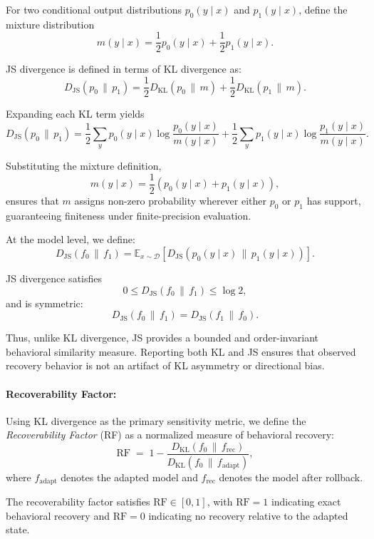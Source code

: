 \documentclass{article}
\begin{document}
	For two conditional output distributions $p_0(y \mid x)$ and $p_1(y \mid x)$, define the mixture distribution
	\[
	m(y \mid x)
	=
	\frac{1}{2} p_0(y \mid x)
	+
	\frac{1}{2} p_1(y \mid x).
	\]
	
	JS divergence is defined in terms of KL divergence as:
	\[
	D_{\mathrm{JS}}(p_0 \,\|\, p_1)
	=
	\frac{1}{2}
	D_{\mathrm{KL}}\!\left(p_0 \,\|\, m\right)
	+
	\frac{1}{2}
	D_{\mathrm{KL}}\!\left(p_1 \,\|\, m\right).
	\]
	
	Expanding each KL term yields
	\[
	D_{\mathrm{JS}}(p_0 \,\|\, p_1)
	=
	\frac{1}{2}
	\sum_y
	p_0(y \mid x)
	\log
	\frac{p_0(y \mid x)}{m(y \mid x)}
	+
	\frac{1}{2}
	\sum_y
	p_1(y \mid x)
	\log
	\frac{p_1(y \mid x)}{m(y \mid x)}.
	\]
	
	Substituting the mixture definition,
	\[
	m(y \mid x)
	=
	\frac{1}{2}
	\left(
	p_0(y \mid x)
	+
	p_1(y \mid x)
	\right),
	\]
	ensures that $m$ assigns non-zero probability wherever either $p_0$ or $p_1$ has support, guaranteeing finiteness under finite-precision evaluation.
	
	At the model level, we define:
	\[
	D_{\mathrm{JS}}(f_0 \,\|\, f_1)
	=
	\mathbb{E}_{x \sim \mathcal{D}}
	\left[
	D_{\mathrm{JS}}
	\left(
	p_0(y \mid x)
	\,\|\, 
	p_1(y \mid x)
	\right)
	\right].
	\]
	
	JS divergence satisfies
	\[
	0 \le D_{\mathrm{JS}}(f_0 \,\|\, f_1) \le \log 2,
	\]
	and is symmetric:
	\[
	D_{\mathrm{JS}}(f_0 \,\|\, f_1)
	=
	D_{\mathrm{JS}}(f_1 \,\|\, f_0).
	\]
	
	Thus, unlike KL divergence, JS provides a bounded and order-invariant behavioral similarity measure. Reporting both KL and JS ensures that observed recovery behavior is not an artifact of KL asymmetry or directional bias.
	
	\paragraph{Recoverability Factor:}
	
	Using KL divergence as the primary sensitivity metric, we define the \emph{Recoverability Factor} (RF) as a normalized measure of behavioral recovery:
	\[
	\mathrm{RF}
	\;=\;
	1 - \frac{D_{\mathrm{KL}}(f_0 \,\|\, f_{\mathrm{rec}})}
	{D_{\mathrm{KL}}(f_0 \,\|\, f_{\mathrm{adapt}})},
	\]
	where $f_{\mathrm{adapt}}$ denotes the adapted model and $f_{\mathrm{rec}}$ denotes the model after rollback.
	
	The recoverability factor satisfies $\mathrm{RF} \in [0,1]$, with $\mathrm{RF} = 1$ indicating exact behavioral recovery and $\mathrm{RF} = 0$ indicating no recovery relative to the adapted state.
	
\end{document}
